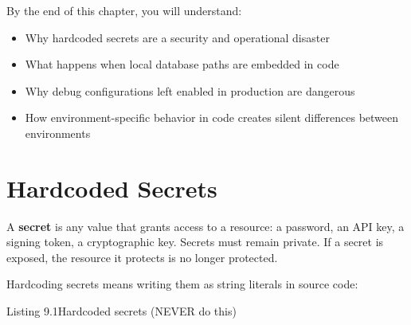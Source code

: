 \begin{objectives}

By the end of this chapter, you will understand:

\begin{itemize}
\tightlist
\item
  Why hardcoded secrets are a security and operational disaster
\item
  What happens when local database paths are embedded in code
\item
  Why debug configurations left enabled in production are dangerous
\item
  How environment-specific behavior in code creates silent differences between environments
\end{itemize}

\end{objectives}

\setcounter{section}{0}
\section{Hardcoded Secrets}\label{09-configuration-coupling:91-hardcoded-secrets}

A \textbf{secret} is any value that grants access to a resource: a password, an API key, a signing token, a cryptographic key. Secrets must remain private. If a secret is exposed, the resource it protects is no longer protected.

Hardcoding secrets means writing them as string literals in source code:

\begin{codeboxcap}[short]{\textcolor{accent}{Listing 9.1}\enspace Hardcoded secrets (NEVER do this)}

\begin{Shaded}
\begin{Highlighting}[]

\OperatorTok{=}\NormalTok{)}

\NormalTok{app.config[}\NormalTok{] }\OperatorTok{=} 

\OperatorTok{=} 

\OperatorTok{=} 

\OperatorTok{=} 
\end{Highlighting}
\end{Shaded}

\end{codeboxcap}

